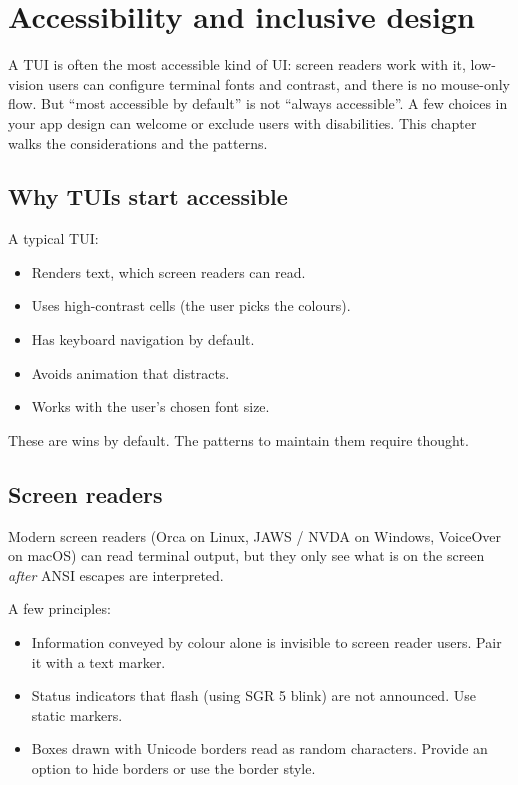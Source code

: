 \chapter{Accessibility and inclusive design}
\label{ch:a11y}

\begin{aside}
A TUI is often the most accessible kind of UI: screen readers
work with it, low-vision users can configure terminal fonts and
contrast, and there is no mouse-only flow. But ``most accessible
by default'' is not ``always accessible''. A few choices in your
app design can welcome or exclude users with disabilities. This
chapter walks the considerations and the patterns.
\end{aside}

\section{Why TUIs start accessible}

A typical TUI:

\begin{itemize}[leftmargin=*]
  \item Renders text, which screen readers can read.
  \item Uses high-contrast cells (the user picks the colours).
  \item Has keyboard navigation by default.
  \item Avoids animation that distracts.
  \item Works with the user's chosen font size.
\end{itemize}

These are wins by default. The patterns to maintain them
require thought.

\section{Screen readers}

Modern screen readers (Orca on Linux, JAWS / NVDA on Windows,
VoiceOver on macOS) can read terminal output, but they only see
what is on the screen \emph{after} ANSI escapes are interpreted.

A few principles:

\begin{itemize}[leftmargin=*]
  \item Information conveyed by colour alone is invisible to
    screen reader users. Pair it with a text marker.
  \item Status indicators that flash (using SGR 5 blink) are
    not announced. Use static markers.
  \item Boxes drawn with Unicode borders read as random
    characters. Provide an option to hide borders or use the
     border style.
\end{itemize}


